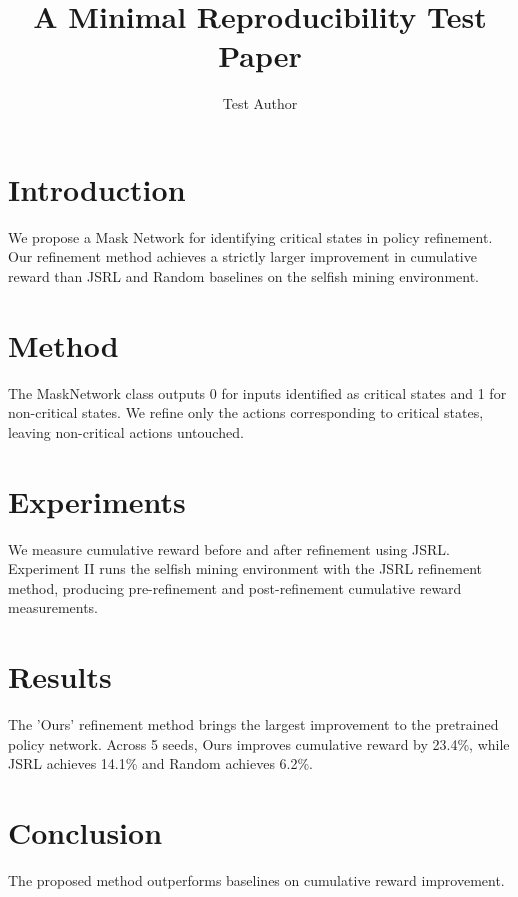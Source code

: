\documentclass{article}
\title{A Minimal Reproducibility Test Paper}
\author{Test Author}
\begin{document}
\maketitle

\section{Introduction}
We propose a Mask Network for identifying critical states in policy refinement.
Our refinement method achieves a strictly larger improvement in cumulative
reward than JSRL and Random baselines on the selfish mining environment.

\section{Method}
The MaskNetwork class outputs 0 for inputs identified as critical states and 1
for non-critical states. We refine only the actions corresponding to critical
states, leaving non-critical actions untouched.

\section{Experiments}
We measure cumulative reward before and after refinement using JSRL.
Experiment II runs the selfish mining environment with the JSRL refinement
method, producing pre-refinement and post-refinement cumulative reward
measurements.

\section{Results}
The 'Ours' refinement method brings the largest improvement to the pretrained
policy network. Across 5 seeds, Ours improves cumulative reward by 23.4\%,
while JSRL achieves 14.1\% and Random achieves 6.2\%.

\section{Conclusion}
The proposed method outperforms baselines on cumulative reward improvement.
\end{document}
